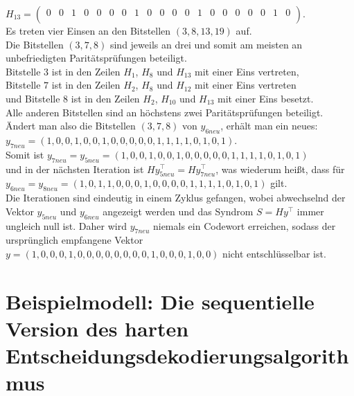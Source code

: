 \begin{Beispiel}
    $H_{13}= \left( \begin{array}{rrrrrrrrrrrrrrrrrrrr}
        0 & 0 & 1 & 0 & 0 & 0 & 0 & 1 & 0 & 0 & 0 & 0 & 1 & 0 & 0 & 0 & 0 & 0 & 1 & 0 \\
       \end{array}\right). 
    $\\
    Es treten vier Einsen an den Bitstellen $(3, 8, 13, 19)$ auf.\\
    
    Die Bitstellen $(3, 7, 8)$ sind jeweils an drei und somit am meisten an unbefriedigten Paritätsprüfungen beteiligt.\\ 
    Bitstelle $3$ ist in den Zeilen $H_1$, $H_8$ und $H_{13}$ mit einer Eins vertreten,\\
    Bitstelle $7$ ist in den Zeilen $H_2$, $H_8$ und $H_{12}$ mit einer Eins vertreten\\
    und Bitstelle $8$ ist in den Zeilen $H_2$, $H_{10}$ und $H_{13}$ mit einer Eins besetzt.\\
    Alle anderen Bitstellen sind an höchstens zwei Paritätsprüfungen beteiligt.\\
     
    Ändert man also die Bitstellen $(3, 7, 8)$ von $y_{6neu}$, erhält man ein neues:\\
    $y_{7neu} = (1,0,0,1,0,0,1,0,0,0,0,0,1,1,1,1,0,1,0,1).$\\
    
    Somit ist $y_{7neu} = y_{5neu} = (1,0,0,1,0,0,1,0,0,0,0,0,1,1,1,1,0,1,0,1)$\\ 
    und in der nächsten Iteration ist $Hy_{5neu}^\intercal= Hy_{7neu}^\intercal$, was wiederum hei\ss{}t, dass für\\
    $y_{6neu} = y_{8neu} = (1,0,1,1,0,0,0,1,0,0,0,0,1,1,1,1,0,1,0,1)$ gilt.\\ 
    Die Iterationen sind eindeutig in einem Zyklus gefangen, wobei abwechselnd der Vektor $y_{5neu}$ und $y_{6neu}$ angezeigt werden und  
    das Syndrom $S= Hy^\intercal$ immer ungleich null ist. 
    Daher wird $y_{7neu}$ niemals ein Codewort erreichen, 
    sodass der ursprünglich empfangene Vektor $y = (1,0,0,0,1,0,0,0,0,0,0,0,0,1,0,0,0,1,0,0)$ nicht entschlüsselbar ist.
    
\end{Beispiel}

\section{Beispielmodell: Die sequentielle Version des harten Entscheidungsdekodierungsalgorithmus} 

